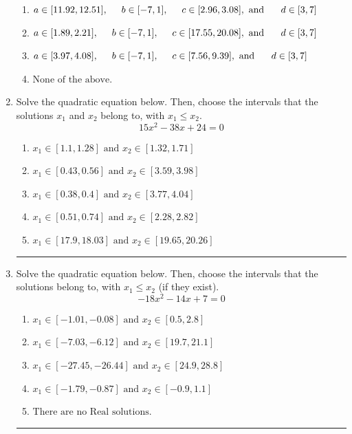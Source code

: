 \documentclass[14pt]{extbook}
\newcommand{\litem}[1]{\item#1\hspace*{-1cm}\rule{\textwidth}{0.4pt}}
\begin{document}
\begin{enumerate}
{\begin{enumerate}[label=\Alph*.]
\item \( a \in [11.92, 12.51], \hspace*{5mm} b \in [-7, 1], \hspace*{5mm} c \in [2.96, 3.08], \text{ and } \hspace*{5mm} d \in [3, 7] \)
\item \( a \in [1.89, 2.21], \hspace*{5mm} b \in [-7, 1], \hspace*{5mm} c \in [17.55, 20.08], \text{ and } \hspace*{5mm} d \in [3, 7] \)
\item \( a \in [3.97, 4.08], \hspace*{5mm} b \in [-7, 1], \hspace*{5mm} c \in [7.56, 9.39], \text{ and } \hspace*{5mm} d \in [3, 7] \)
\item \( \text{None of the above.} \)

\end{enumerate} }
\litem{
Solve the quadratic equation below. Then, choose the intervals that the solutions $x_1$ and $x_2$ belong to, with $x_1 \leq x_2$.\[ 15x^{2} -38 x + 24 = 0 \]\begin{enumerate}[label=\Alph*.]
\item \( x_1 \in [1.1, 1.28] \text{ and } x_2 \in [1.32, 1.71] \)
\item \( x_1 \in [0.43, 0.56] \text{ and } x_2 \in [3.59, 3.98] \)
\item \( x_1 \in [0.38, 0.4] \text{ and } x_2 \in [3.77, 4.04] \)
\item \( x_1 \in [0.51, 0.74] \text{ and } x_2 \in [2.28, 2.82] \)
\item \( x_1 \in [17.9, 18.03] \text{ and } x_2 \in [19.65, 20.26] \)

\end{enumerate} }
\litem{
Solve the quadratic equation below. Then, choose the intervals that the solutions belong to, with $x_1 \leq x_2$ (if they exist).\[ -18x^{2} -14 x + 7 = 0 \]\begin{enumerate}[label=\Alph*.]
\item \( x_1 \in [-1.01, -0.08] \text{ and } x_2 \in [0.5, 2.8] \)
\item \( x_1 \in [-7.03, -6.12] \text{ and } x_2 \in [19.7, 21.1] \)
\item \( x_1 \in [-27.45, -26.44] \text{ and } x_2 \in [24.9, 28.8] \)
\item \( x_1 \in [-1.79, -0.87] \text{ and } x_2 \in [-0.9, 1.1] \)
\item \( \text{There are no Real solutions.} \)


\end{enumerate}}
\end{enumerate}
\end{document}

